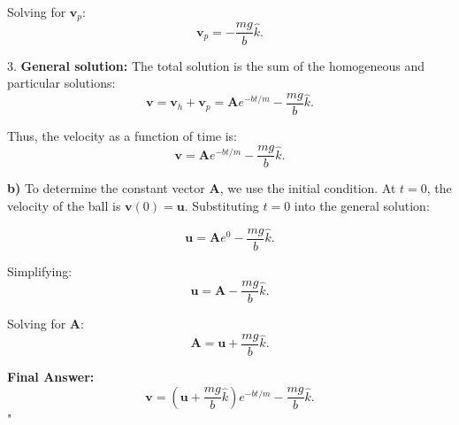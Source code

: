 Solving for $\mathbf{v}_p$:
\[
\mathbf{v}_p = -\frac{mg}{b} \hat{k}.
\]

3. \textbf{General solution:} The total solution is the sum of the homogeneous and particular solutions:
\[
\mathbf{v} = \mathbf{v}_h + \mathbf{v}_p = \mathbf{A} e^{-bt/m} - \frac{mg}{b} \hat{k}.
\]

Thus, the velocity as a function of time is:
\[
\mathbf{v} = \mathbf{A} e^{-bt/m} - \frac{mg}{b} \hat{k}.
\]

\textbf{b)} To determine the constant vector $\mathbf{A}$, we use the initial condition. At $t = 0$, the velocity of the ball is $\mathbf{v}(0) = \mathbf{u}$. Substituting $t = 0$ into the general solution:

\[
\mathbf{u} = \mathbf{A} e^{0} - \frac{mg}{b} \hat{k}.
\]

Simplifying:
\[
\mathbf{u} = \mathbf{A} - \frac{mg}{b} \hat{k}.
\]

Solving for $\mathbf{A}$:
\[
\mathbf{A} = \mathbf{u} + \frac{mg}{b} \hat{k}.
\]

\textbf{Final Answer:}
\[
\mathbf{v} = \left( \mathbf{u} + \frac{mg}{b} \hat{k} \right) e^{-bt/m} - \frac{mg}{b} \hat{k}.
\]
"